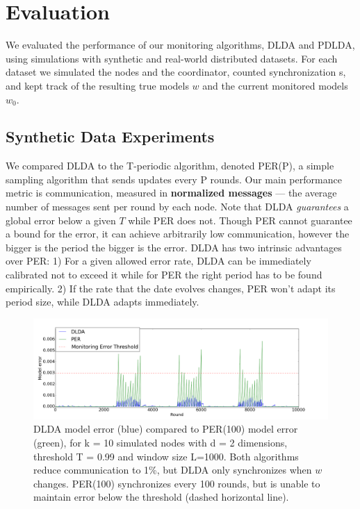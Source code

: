\documentclass{sig-alternate-05-2015}
\begin{document}
\section{Evaluation}
We evaluated the performance of our monitoring algorithms,
DLDA and PDLDA, using simulations with synthetic and real-world 
distributed datasets. 
For each dataset we simulated the nodes and the coordinator, 
counted synchronization s, and kept track of the resulting true models $w$ and the
current monitored models $w_0$. 
\subsection{Synthetic Data Experiments}
We compared DLDA to the T-periodic algorithm, denoted
PER(P), a simple sampling algorithm that sends updates
every P rounds.
Our main performance metric is communication, measured
in \textbf{normalized messages} --- the average number of messages sent per
round by each node. Note that DLDA \textit{guarantees}
a global error below a given $T$ while PER does not.
Though PER cannot guarantee a bound for the
error, it can achieve arbitrarily low communication, however the bigger is the period the bigger is the error. DLDA has two intrinsic 
advantages over PER: 1) For a given allowed error rate, DLDA can be immediately 
calibrated not to exceed it while for PER the right period has to be found empirically.
2) If the rate that the date evolves changes, PER won't adapt its period size, 
while DLDA adapts immediately.


\begin{figure}[ht]
	\centering
	\includegraphics[width=\textwidth]{PER/PERvsDLDAoverTime.png}
	\caption{ DLDA model error (blue) compared to PER(100) model error (green), 
	for k = 10 simulated nodes with d = 2 dimensions, threshold T = 0.99 and
	window size L=1000. Both algorithms reduce communication to 1\%, but DLDA
	only synchronizes when $w$ changes. PER(100) synchronizes every 100 rounds, 
	but is unable to maintain error below the threshold (dashed horizontal line).}
	\label{PERvsDLDAoverTime}
\end{figure}
	
\end{document}
